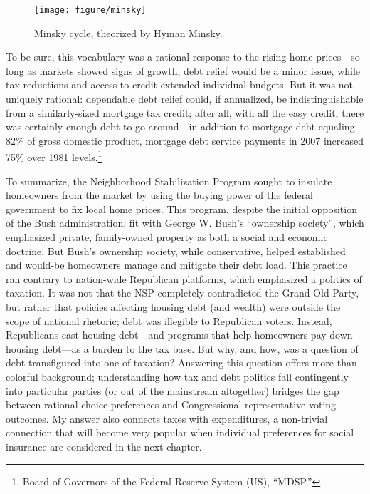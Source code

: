 \documentclass[
]{article}
\let\rmarkdownfootnote\footnote%
\def\footnote{\protect\rmarkdownfootnote}
\begin{document}
\begin{figure}

{\centering \texttt{[image: figure/minsky]}

}

\caption{Minsky cycle, theorized by Hyman Minsky.}\label{fig:minsky}
\end{figure}

To be sure, this vocabulary was a rational response to the rising home
prices---so long as markets showed signs of growth, debt relief would be
a minor issue, while tax reductions and access to credit extended
individual budgets. But it was not uniquely rational: dependable debt
relief could, if annualized, be indistinguishable from a similarly-sized
mortgage tax credit; after all, with all the easy credit, there was
certainly enough debt to go around---in addition to mortgage debt
equaling 82\% of gross domestic product, mortgage debt service payments
in 2007 increased 75\% over 1981 levels.\footnote{Board of Governors of
  the Federal Reserve System (US), ``MDSP.''}

To summarize, the Neighborhood Stabilization Program sought to insulate
homeowners from the market by using the buying power of the federal
government to fix local home prices. This program, despite the initial
opposition of the Bush administration, fit with George W. Bush's
``ownership society'', which emphasized private, family-owned property
as both a social and economic doctrine. But Bush's ownership society,
while conservative, helped established and would-be homeowners manage
and mitigate their debt load. This practice ran contrary to nation-wide
Republican platforms, which emphasized a politics of taxation. It was
not that the NSP completely contradicted the Grand Old Party, but rather
that policies affecting housing debt (and wealth) were outside the scope
of national rhetoric; debt was illegible to Republican voters. Instead,
Republicans cast housing debt---and programs that help homeowners pay
down housing debt---as a burden to the tax base. But why, and how, was a
question of debt transfigured into one of taxation? Answering this
question offers more than colorful background; understanding how tax and
debt politics fall contingently into particular parties (or out of the
mainstream altogether) bridges the gap between rational choice
preferences and Congressional representative voting outcomes. My answer
also connects taxes with expenditures, a non-trivial connection that
will become very popular when individual preferences for social
insurance are considered in the next chapter.
\end{document}
